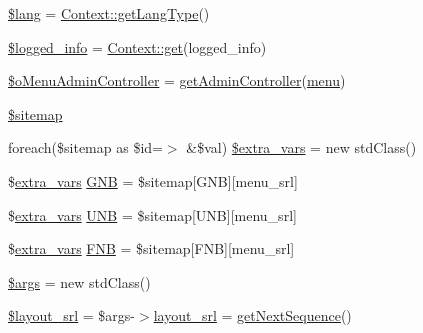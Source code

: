 \begin{DoxyCompactItemize}
\item 
\hyperlink{ko_8install_8php_a7714b111b644017933931ec69a154102}{\$lang} = \hyperlink{classContext_ae75d6f4064d09e48d0d76614b6997e29}{Context\+::get\+Lang\+Type}()
\item 
\hyperlink{ko_8install_8php_a193c1593ceb216e9fb05b0bad01ebbc8}{\$logged\+\_\+info} = \hyperlink{classContext_a90ce25d65fe6c9778421cbb36ab3def5}{Context\+::get}(\textquotesingle{}logged\+\_\+info\textquotesingle{})
\item 
\hyperlink{ko_8install_8php_a9062530c3b03479ca4530daee1c18887}{\$o\+Menu\+Admin\+Controller} = \hyperlink{func_8inc_8php_a2f7ca88a5226536aca3b2f5682bd7b2d}{get\+Admin\+Controller}(\textquotesingle{}\hyperlink{classmenu}{menu}\textquotesingle{})
\item 
\hyperlink{ko_8install_8php_ae7b8fee391a6d8b9162de5b69b9dc07f}{\$sitemap}
\item 
foreach(\$sitemap as \$id=$>$ \&\$val) \hyperlink{ko_8install_8php_a99863a9d4b597491e1a9c801f2e55c0b}{\$extra\+\_\+vars} = new std\+Class()
\item 
\$\hyperlink{ko_8install_8php_ae1dcb37fc34a8f312d2e6abd6f806743}{extra\+\_\+vars} \hyperlink{ko_8install_8php_a9b1716b68fc04f3492448f38148dcbf5}{G\+N\+B} = \$sitemap\mbox{[}\textquotesingle{}G\+N\+B\textquotesingle{}\mbox{]}\mbox{[}\textquotesingle{}menu\+\_\+srl\textquotesingle{}\mbox{]}
\item 
\$\hyperlink{ko_8install_8php_ae1dcb37fc34a8f312d2e6abd6f806743}{extra\+\_\+vars} \hyperlink{ko_8install_8php_abc0cb1f57d83d4a106f4495c30e0df52}{U\+N\+B} = \$sitemap\mbox{[}\textquotesingle{}U\+N\+B\textquotesingle{}\mbox{]}\mbox{[}\textquotesingle{}menu\+\_\+srl\textquotesingle{}\mbox{]}
\item 
\$\hyperlink{ko_8install_8php_ae1dcb37fc34a8f312d2e6abd6f806743}{extra\+\_\+vars} \hyperlink{ko_8install_8php_a683e060c22be3e658be6f9751a2082f0}{F\+N\+B} = \$sitemap\mbox{[}\textquotesingle{}F\+N\+B\textquotesingle{}\mbox{]}\mbox{[}\textquotesingle{}menu\+\_\+srl\textquotesingle{}\mbox{]}
\item 
\hyperlink{ko_8install_8php_a67e94494731d99ed23b123e95175bc10}{\$args} = new std\+Class()
\item 
\hyperlink{ko_8install_8php_a77889723c4aa360089caae223118d413}{\$layout\+\_\+srl} = \$args-\/$>$\hyperlink{ko_8install_8php_a70054876db09b2519a1726663c8dd9e7}{layout\+\_\+srl} = \hyperlink{func_8inc_8php_a5a97b458f9c5b4fe3574671840aee27c}{get\+Next\+Sequence}()
\item 

\end{DoxyCompactItemize}
